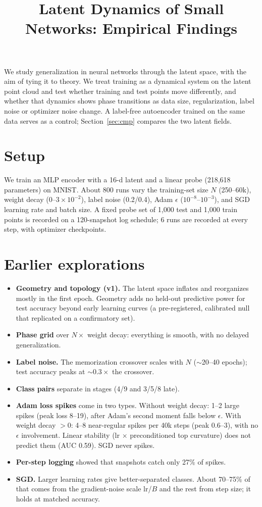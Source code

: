\documentclass[10pt]{article}
\title{Latent Dynamics of Small Networks: Empirical Findings}
\author{}
\date{}
\begin{document}
\maketitle

\noindent We study generalization in neural networks through the latent space, with the aim of tying it to theory. We treat training as a dynamical system on the latent point cloud and test whether training and test points move differently, and whether that dynamics shows phase transitions as data size, regularization, label noise or optimizer noise change. A label-free autoencoder trained on the same data serves as a control; Section~\ref{sec:cmp} compares the two latent fields.

\section{Setup}
We train an MLP encoder with a 16-d latent and a linear probe (218,618 parameters) on MNIST. About 800 runs vary the training-set size $N$ (250--60k), weight decay (0--$3\times10^{-2}$), label noise (0.2/0.4), Adam $\epsilon$ ($10^{-8}$--$10^{-3}$), and SGD learning rate and batch size. A fixed probe set of 1,000 test and 1,000 train points is recorded on a 120-snapshot log schedule; 6 runs are recorded at every step, with optimizer checkpoints.

\section{Earlier explorations}
\begin{itemize}
\item \textbf{Geometry and topology (v1).} The latent space inflates and reorganizes mostly in the first epoch. Geometry adds no held-out predictive power for test accuracy beyond early learning curves (a pre-registered, calibrated null that replicated on a confirmatory set).
\item \textbf{Phase grid} over $N\times$ weight decay: everything is smooth, with no delayed generalization.
\item \textbf{Label noise.} The memorization crossover scales with $N$ ($\sim$20--40 epochs); test accuracy peaks at $\sim0.3\times$ the crossover.
\item \textbf{Class pairs} separate in stages (4/9 and 3/5/8 late).
\item \textbf{Adam loss spikes} come in two types. Without weight decay: 1--2 large spikes (peak loss 8--19), after Adam's second moment falls below $\epsilon$. With weight decay $>0$: 4--8 near-regular spikes per 40k steps (peak 0.6--3), with no $\epsilon$ involvement. Linear stability (lr $\times$ preconditioned top curvature) does not predict them (AUC 0.59). SGD never spikes.
\item \textbf{Per-step logging} showed that snapshots catch only 27\% of spikes.
\item \textbf{SGD.} Larger learning rates give better-separated classes. About 70--75\% of that comes from the gradient-noise scale lr/$B$ and the rest from step size; it holds at matched accuracy.
\end{itemize}
\end{document}
